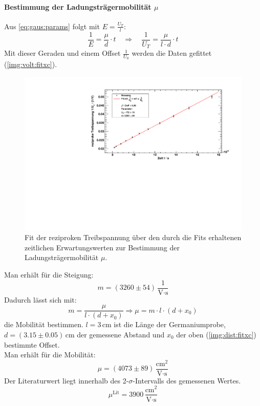 \paragraph{Bestimmung der Ladungsträgermobilität $\mu$} 
Aus \autoref{eq:gaus:params} folgt mit $E = \frac{U_T}{l}$:
\begin{equation}
  \frac{1}{E} = \frac{\mu}{d} \cdot t \quad \Rightarrow \quad \frac{1}{U_T} = \frac{\mu}{l\cdot d} \cdot t
\end{equation}
Mit dieser Geraden und einem Offset $\frac{1}{U_0}$ werden die Daten gefittet (\autoref{img:volt:fitxc}).
\begin{figure}[H]
\begin{center}
  \includegraphics[width=\textwidth]{../img/part2/volt_fitXc.pdf}
  \caption{Fit der reziproken Treibspannung über den durch die Fits erhaltenen zeitlichen Erwartungswerten 
  zur Bestimmung der Ladungsträgermobilität $\mu$.}
  \label{img:volt:fitxc}
\end{center}
\end{figure}
Man erhält für die Steigung:
\begin{equation}
  m = (3260 \pm 54)\,\frac{1}{\text{V}\cdot\text{s}}
\end{equation}
Dadurch lässt sich mit:
\begin{equation}
  m = \frac{\mu}{l \cdot (d + x_0)} \Rightarrow \mu = m \cdot l \cdot (d + x_0)
\end{equation}
die Mobilität bestimmen. $l=3$\,cm ist die Länge der Germaniumprobe, $d=(3.15\pm 0.05)$\,cm der gemessene Abstand und $x_0$ 
der oben (\autoref{img:dist:fitxc}) bestimmte Offset. \\
Man erhält für die Mobilität:
\begin{equation}
  \mu = (4073 \pm 89)\,\frac{\text{cm}^2}{\text{V} \cdot \text{s}}
\end{equation}
Der Literaturwert liegt innerhalb des 2-$\sigma$-Intervalls des gemessenen Wertes.
\begin{equation}
  \mu^{\text{Lit}} = 3900\,\frac{\text{cm}^2}{\text{V} \cdot \text{s}}
\end{equation}

